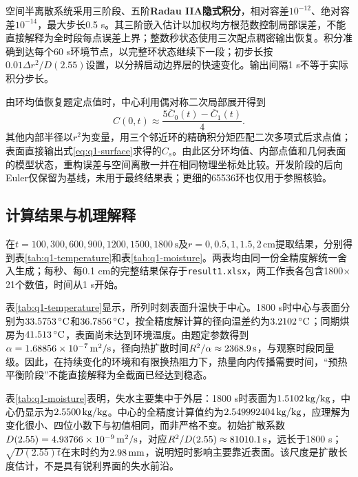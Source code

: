 空间半离散系统采用三阶段、五阶\textbf{Radau IIA隐式积分}，相对容差$10^{-12}$、绝对容差$10^{-14}$，最大步长0.5 s。其三阶嵌入估计以加权均方根范数控制局部误差，不能直接解释为全时段每点误差上界；整数秒状态使用三次配点稠密输出恢复\cite{q1-radau}。积分准确到达每个60 s环境节点，以完整环状态继续下一段；初步长按$0.01\Delta r^2/D(2.55)$设置，以分辨启动边界层的快速变化。输出间隔1 s不等于实际积分步长。

由环均值恢复题定点值时，中心利用偶对称二次局部展开得到
\begin{equation}
C(0,t)\approx\frac{5\bar C_0(t)-\bar C_1(t)}4.
\label{eq:q1-center}
\end{equation}
其他内部半径以$r^2$为变量，用三个邻近环的精确积分矩匹配二次多项式后求点值；表面直接输出式\eqref{eq:q1-surface}求得的$C_s$。由此区分环均值、内部点值和几何表面的模型状态，重构误差与空间离散一并在相同物理坐标处比较。开发阶段的后向Euler仅保留为基线，未用于最终结果表；更细的65536环也仅用于参照核验。

\subsection{计算结果与机理解释}

在$t=100,300,600,900,1200,1500,1800\,\mathrm s$及$r=0,0.5,1,1.5,2\,\mathrm{cm}$提取结果，分别得到表\ref{tab:q1-temperature}和表\ref{tab:q1-moisture}。两表均由同一份全精度解统一舍入生成；每秒、每0.1 cm的完整结果保存于\texttt{result1.xlsx}，两工作表各包含1800$\times$21个数值，时间从1 s开始。




表\ref{tab:q1-temperature}显示，所列时刻表面升温快于中心。1800 s时中心与表面分别为$33.5753\,{}^{\circ}\mathrm C$和$36.7856\,{}^{\circ}\mathrm C$，按全精度解计算的径向温差约为$3.2102\,{}^{\circ}\mathrm C$；同期烘房为$41.513\,{}^{\circ}\mathrm C$，表面尚未达到环境温度。由题定参数得到$\alpha=1.68856\times10^{-7}\,\mathrm{m^2/s}$，径向热扩散时间$R^2/\alpha\approx2368.9\,\mathrm s$，与观察时段同量级。因此，在持续变化的环境和有限换热阻力下，热量向内传播需要时间，“预热平衡阶段”不能直接解释为全截面已经达到稳态。

\begin{samepage}
表\ref{tab:q1-moisture}表明，失水主要集中于外层：1800 s时表面为$1.5102\,\mathrm{kg/kg}$，中心仍显示为$2.5500\,\mathrm{kg/kg}$。中心的全精度计算值约为$2.549992404\,\mathrm{kg/kg}$，应理解为变化很小、四位小数下与初值相同，而非严格不变。初始扩散系数$D(2.55)=4.93766\times10^{-9}\,\mathrm{m^2/s}$，对应$R^2/D(2.55)\approx81010.1\,\mathrm s$，远长于1800 s；$\sqrt{D(2.55)t}$在末时约为$2.98\,\mathrm{mm}$，说明短时影响主要靠近表面。该尺度是扩散长度估计，不是具有锐利界面的失水前沿。
\par
\end{samepage}

